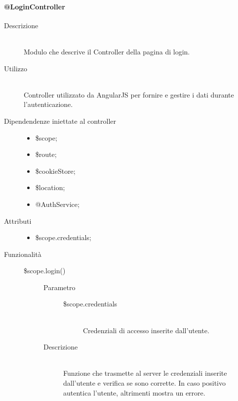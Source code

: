 \paragraph{@LoginController}
\begin{description}
 \item[Descrizione] \hfill \\
 Modulo che descrive il Controller della pagina di login.
 
 \item[Utilizzo] \hfill \\
 Controller utilizzato da AngularJS per fornire e gestire i dati durante l'autenticazione.
 
 \item[Dipendendenze iniettate al controller] \hfill
 \begin{itemize}
  \item \$scope;
  \item \$route;
  \item \$cookieStore;
  \item \$location;
  \item @AuthService;
  
 \end{itemize}
 
 \item[Attributi] \hfill
 \begin{itemize}
 \item \$scope.credentials;
 \end{itemize}
 
 \item[Funzionalità] \hfill
 \begin{description}
  \item[\$scope.login()] \hfill
  \begin{description}
  	\item[Parametro] \hfill
  	\begin{description}
  		\item[\$scope.credentials] \hfill \\
  		Credenziali di accesso inserite dall'utente.
  	\end{description}
  	\item[Descrizione] \hfill \\
  	Funzione che trasmette al server le credenziali inserite dall'utente e verifica se sono corrette.
  	In caso positivo autentica l'utente, altrimenti mostra un errore.
  \end{description}
 
  
 \end{description}
\end{description}

